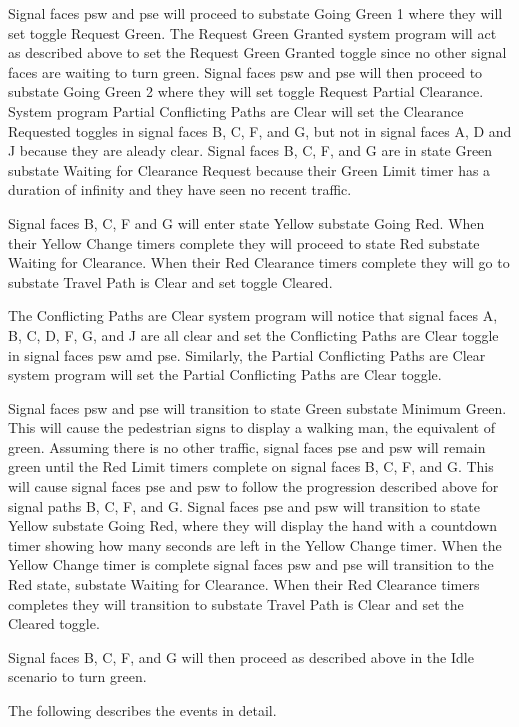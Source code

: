 \documentclass[letterpaper,twoside]{article}
\begin{document}
Signal faces psw and pse will proceed to substate Going Green 1 where
they will set
toggle Request Green.  The Request Green Granted system program will act
as described above to set the Request Green Granted toggle since no other
signal faces are waiting to turn green.  Signal faces psw and pse will then
proceed to substate Going Green 2 where they will set toggle Request Partial
Clearance.  System program Partial Conflicting Paths are Clear will set
the Clearance Requested toggles in signal faces B, C, F, and G,
but not in signal faces A, D and J because they are aleady clear.
Signal faces B, C, F, and G are in state Green substate Waiting for Clearance
Request because their Green Limit timer has a duration of infinity and
they have seen no recent traffic.

Signal faces B, C, F and G will enter state Yellow substate Going Red.
When their Yellow Change timers complete they will proceed to state Red
substate Waiting for Clearance.
When their Red Clearance timers complete they will go
to substate Travel Path is Clear and set toggle Cleared.

The Conflicting Paths are Clear system program will notice that
signal faces A, B, C, D, F, G, and J are all clear and set the
Conflicting Paths are Clear toggle in signal faces psw amd pse.  Similarly,
the Partial Conflicting Paths are Clear system program will set the
Partial Conflicting Paths are Clear toggle.

Signal faces psw and pse will transition to state Green substate Minimum Green.
This will cause the pedestrian signs to display a walking man, the equivalent
of green.  Assuming there is no other traffic, signal faces pse and psw
will remain green
until the Red Limit timers complete on signal faces B, C, F, and G.
This will cause signal faces pse and psw to follow the progression described
above
for signal paths B, C, F, and G.  Signal faces pse and psw will transition
to state Yellow
substate Going Red, where they will display the hand with a countdown timer
showing how many seconds are left in the Yellow Change timer.  When the Yellow
Change timer is complete signal faces psw and pse will transition to the
Red state,
substate Waiting for Clearance.  When their Red Clearance timers completes
they will
transition to substate Travel Path is Clear and set the Cleared toggle.

Signal faces B, C, F, and G will then proceed as described above
in the Idle scenario to turn green.

The following describes the events in detail.
\end{document}

